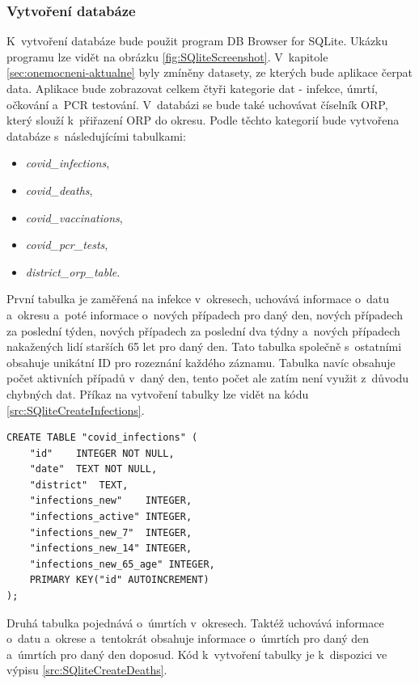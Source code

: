 \subsubsection*{Vytvoření databáze}

K~vytvoření databáze bude použit program DB Browser for SQLite. Ukázku programu lze vidět na obrázku \ref{fig:SQliteScreenshot}. V~kapitole \ref{sec:onemocneni-aktualne} byly zmíněny datasety, ze kterých bude aplikace čerpat data. Aplikace bude zobrazovat celkem čtyři kategorie dat - infekce, úmrtí, očkování a~PCR testování. V~databázi se bude také uchovávat číselník ORP, který slouží k~přiřazení ORP do okresu. Podle těchto kategorií bude vytvořena databáze s~následujícími tabulkami:

\begin{itemize}
    \item \emph{covid\_infections},
    \item \emph{covid\_deaths},
    \item \emph{covid\_vaccinations},
    \item \emph{covid\_pcr\_tests},
    \item \emph{district\_orp\_table}.
\end{itemize}

První tabulka je zaměřená na infekce v~okresech, uchovává informace o~datu a~okresu a~poté informace o~nových případech pro daný den, nových případech za poslední týden, nových případech za poslední dva týdny a~nových případech nakažených lidí starších 65 let pro daný den. Tato tabulka společně s~ostatními obsahuje unikátní ID pro rozeznání každého záznamu. Tabulka navíc obsahuje počet aktivních případů v~daný den, tento počet ale zatím není využit z~důvodu chybných dat. Příkaz na vytvoření tabulky lze vidět na kódu \ref{src:SQliteCreateInfections}. 

\begin{lstlisting}[style=enhancedSQL,label=src:SQliteCreateInfections,caption={Vytvoření SQLite tabulky na infekce}]
CREATE TABLE "covid_infections" (
	"id"	INTEGER NOT NULL,
	"date"	TEXT NOT NULL,
	"district"	TEXT,
	"infections_new"	INTEGER,
	"infections_active"	INTEGER,
	"infections_new_7"	INTEGER,
	"infections_new_14"	INTEGER,
	"infections_new_65_age"	INTEGER,
	PRIMARY KEY("id" AUTOINCREMENT)
);
\end{lstlisting}

Druhá tabulka pojednává o~úmrtích v~okresech. Taktéž uchovává informace o~datu a~okrese a~tentokrát obsahuje informace o~úmrtích pro daný den a~úmrtích pro daný den doposud. Kód k~vytvoření tabulky je k~dispozici ve výpisu \ref{src:SQliteCreateDeaths}.

